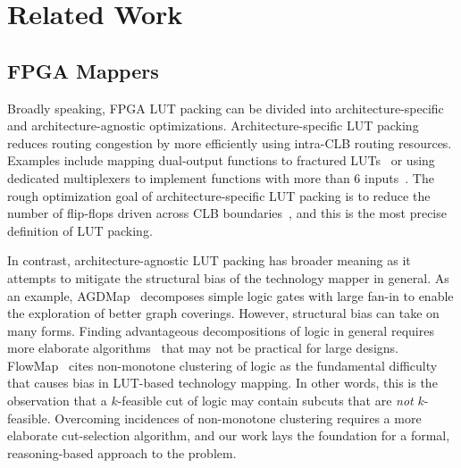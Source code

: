 \section{Related Work}\label{sec:relatedwork}
\subsection{FPGA Mappers}\label{sec:relatedwork:fpga}
Broadly speaking, FPGA LUT packing can be divided into architecture-specific
and architecture-agnostic optimizations. Architecture-specific LUT packing
reduces routing congestion by more efficiently using intra-CLB routing
resources. Examples include mapping dual-output functions to fractured
LUTs~\cite{fraclut} or using dedicated multiplexers to implement functions with
more than 6 inputs~\cite{ug574}. The rough optimization goal of
architecture-specific LUT packing is to reduce the number of flip-flops driven
across CLB boundaries~\cite{ffpack}, and this is the most precise definition of
LUT packing.

In contrast, architecture-agnostic LUT packing has broader meaning as it
attempts to mitigate the structural bias of the technology mapper in general.
As an example, AGDMap~\cite{adaptdecomp} decomposes simple logic gates with
large fan-in to enable the exploration of better graph coverings. However,
structural bias can take on many forms. Finding advantageous decompositions of
logic in general requires more elaborate algorithms~\cite{dsd} that may not be
practical for large designs. FlowMap~\cite{flowmap} cites non-monotone
clustering of logic as the fundamental difficulty that causes bias in LUT-based
technology mapping. In other words, this is the observation that a $k$-feasible
cut of logic may contain subcuts that are \textit{not} $k$-feasible. Overcoming
incidences of non-monotone clustering requires a more elaborate cut-selection
algorithm, and our work lays the foundation for a formal, reasoning-based
approach to the problem.

